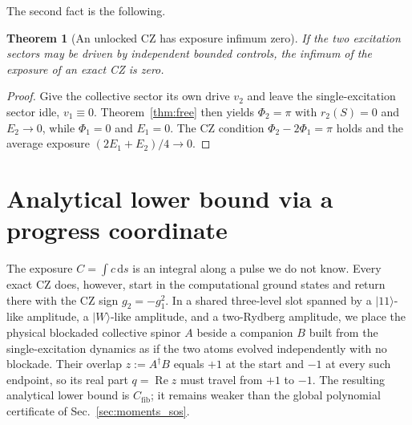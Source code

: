 \documentclass[aps,prx,reprint,nofootinbib,longbibliography,floatfix]{revtex4-2}
\newtheorem{theorem}{Theorem}
\theoremstyle{plain}
\theoremstyle{remark}
\newcommand{\dd}{\mathrm{d}}
\newcommand{\bket}[1]{|#1\rangle}
\begin{document}
The second fact is the following.
\begin{theorem}[An unlocked CZ has exposure infimum zero]
\label{thm:relax}
If the two excitation sectors may be driven by independent bounded controls, the infimum of the exposure of an exact CZ is zero.
\end{theorem}
\begin{proof}
Give the collective sector its own drive $v_2$ and leave the single-excitation sector idle, $v_1\equiv 0$. Theorem~\ref{thm:free} then yields $\Phi_2=\pi$ with $r_2(S)=0$ and $E_2\to 0$, while $\Phi_1=0$ and $E_1=0$. The CZ condition $\Phi_2-2\Phi_1=\pi$ holds and the average exposure $(2E_1+E_2)/4\to 0$.
\end{proof}

\section{Analytical lower bound via a progress coordinate}
\label{sec:analytical}

The exposure $C=\int c\,\dd s$ is an integral along a pulse we do not know. Every exact CZ does, however, start in the computational ground states and return there with the CZ sign $g_2=-g_1^2$. In a shared three-level slot spanned by a $\bket{11}$-like amplitude, a $\bket{W}$-like amplitude, and a two-Rydberg amplitude, we place the physical blockaded collective spinor $A$ beside a companion $B$ built from the single-excitation dynamics as if the two atoms evolved independently with no blockade. Their overlap $z:=A^\dagger B$ equals $+1$ at the start and $-1$ at every such endpoint, so its real part $q=\operatorname{Re}z$ must travel from $+1$ to $-1$. The resulting analytical lower bound is $C_{\mathrm{fib}}$; it remains weaker than the global polynomial certificate of Sec.~\ref{sec:moments_sos}.
\end{document}
